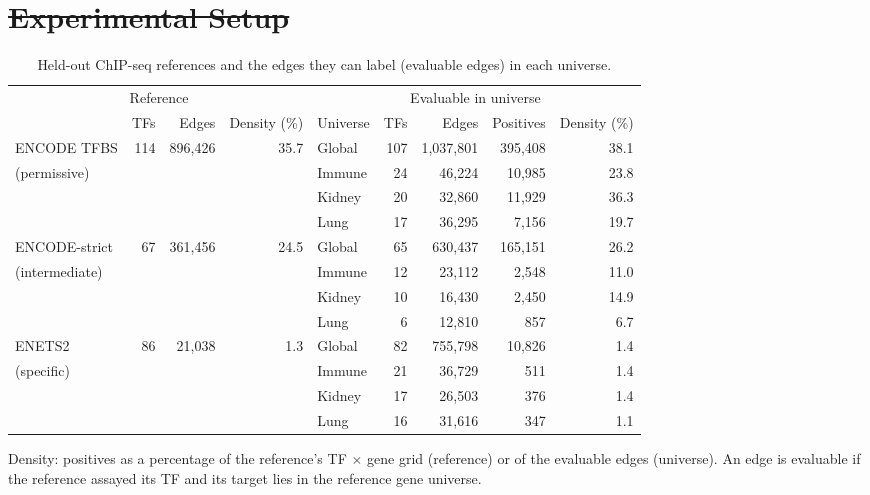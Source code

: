 \documentclass[11pt,a4paper]{article}
\providecommand{\DIFdeltex}[1]{{\protect\color{red}\sout{#1}}}                      %
\providecommand{\DIFaddbegin}{} %
\providecommand{\DIFdelbegin}{} %
\providecommand{\DIFdelend}{} %
\providecommand{\DIFdel}[1]{\texorpdfstring{\DIFdeltex{#1}}{}} %
\newcommand{\DIFscaledelfig}{0.5}
\newlength{\DIFdelgraphicswidth} %
\newlength{\DIFdelgraphicsheight} %
\newcommand{\DIFaddincludegraphics}[2][]{{\color{blue}\fbox{\DIFOincludegraphics[#1]{#2}}}} %
\newcommand{\DIFdelincludegraphics}[2][]{%
\sbox{\DIFdelgraphicsbox}{\DIFOincludegraphics[#1]{#2}}%
\settoboxwidth{\DIFdelgraphicswidth}{\DIFdelgraphicsbox} %
\settoboxtotalheight{\DIFdelgraphicsheight}{\DIFdelgraphicsbox} %
\scalebox{\DIFscaledelfig}{%
\parbox[b]{\DIFdelgraphicswidth}{\usebox{\DIFdelgraphicsbox}\\[-\baselineskip] \rule{\DIFdelgraphicswidth}{0em}}\llap{\resizebox{\DIFdelgraphicswidth}{\DIFdelgraphicsheight}{%
\setlength{\unitlength}{\DIFdelgraphicswidth}%
\begin{picture}(1,1)%
\thicklines\linethickness{2pt} %
{\color[rgb]{1,0,0}\put(0,0){\framebox(1,1){}}}%
{\color[rgb]{1,0,0}\put(0,0){\line( 1,1){1}}}%
{\color[rgb]{1,0,0}\put(0,1){\line(1,-1){1}}}%
\end{picture}%
}\hspace*{3pt}}} %
} %
\DeclareRobustCommand{\DIFaddbegin}{\DIFOaddbegin \let\includegraphics\DIFaddincludegraphics} %
\DeclareRobustCommand{\DIFdelbegin}{\DIFOdelbegin \let\includegraphics\DIFdelincludegraphics} %
\DeclareRobustCommand{\DIFdelend}{\DIFOaddend \let\includegraphics\DIFOincludegraphics} %
\begin{document}
\DIFdelbegin \section{\DIFdel{Experimental Setup}}%
\addtocounter{section}{-1}%
\DIFdelend \DIFaddbegin \begin{table}[tbp]
\centering
\small
\setlength{\tabcolsep}{4pt}
\caption{Held-out ChIP-seq references and the edges they can label (evaluable edges) in each universe.}
\label{tab:chip}
\begin{tabular}{@{}lrrrlrrrr@{}}
\toprule
\multicolumn{4}{c}{Reference} & \multicolumn{5}{c}{Evaluable in universe} \\
\cmidrule(lr){1-4}\cmidrule(lr){5-9}
 & TFs & Edges & Density (\%) & Universe & TFs & Edges & Positives & Density (\%) \\
\midrule
ENCODE TFBS & 114 & 896{,}426 & 35.7 & Global & 107 & 1{,}037{,}801 & 395{,}408 & 38.1 \\
{\footnotesize (permissive)} &  &  &  & Immune & 24 & 46{,}224 & 10{,}985 & 23.8 \\
 &  &  &  & Kidney & 20 & 32{,}860 & 11{,}929 & 36.3 \\
 &  &  &  & Lung & 17 & 36{,}295 & 7{,}156 & 19.7 \\
\addlinespace[2pt]
ENCODE-strict & 67 & 361{,}456 & 24.5 & Global & 65 & 630{,}437 & 165{,}151 & 26.2 \\
{\footnotesize (intermediate)} &  &  &  & Immune & 12 & 23{,}112 & 2{,}548 & 11.0 \\
 &  &  &  & Kidney & 10 & 16{,}430 & 2{,}450 & 14.9 \\
 &  &  &  & Lung & 6 & 12{,}810 & 857 & 6.7 \\
\addlinespace[2pt]
ENETS2 & 86 & 21{,}038 & 1.3 & Global & 82 & 755{,}798 & 10{,}826 & 1.4 \\
{\footnotesize (specific)} &  &  &  & Immune & 21 & 36{,}729 & 511 & 1.4 \\
 &  &  &  & Kidney & 17 & 26{,}503 & 376 & 1.4 \\
 &  &  &  & Lung & 16 & 31{,}616 & 347 & 1.1 \\
\bottomrule
\end{tabular}
\par\smallskip
\begin{minipage}{\linewidth}\footnotesize
Density: positives as a percentage of the reference's TF $\times$ gene grid (reference) or of the evaluable edges (universe). An edge is evaluable if the reference assayed its TF and its target lies in the reference gene universe.


\end{minipage}
\end{table}
\end{document}
